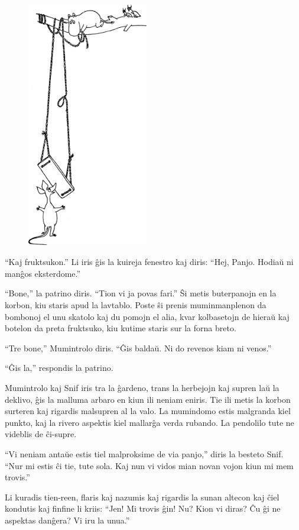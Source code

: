 \begin{figure}
\includegraphics[width=150pt,height=305pt]{1-2.png}\end{figure}

``Kaj fruktsukon.'' Li iris ĝis la kuireja fenestro kaj diris: ``Hej, Panjo. Hodiaŭ ni manĝos eksterdome.''

``Bone,'' la patrino diris. ``Tion vi ja povas fari.'' Ŝi metis buterpanojn en la korbon, kiu staris apud la lavtablo. Poste ŝi prenis muminmanplenon da bombonoj el unu skatolo kaj du pomojn el alia, kvar kolbasetojn de hieraŭ kaj botelon da preta fruktsuko, kiu kutime staris sur la forna breto.

``Tre bone,'' Mumintrolo diris. ``Ĝis baldaŭ. Ni do revenos kiam ni venos.''

``Ĝis la,'' respondis la patrino.

Mumintrolo kaj Snif iris tra la ĝardeno, trans la herbejojn kaj supren laŭ la deklivo, ĝis la malluma arbaro en kiun ili neniam eniris. Tie ili metis la korbon surteren kaj rigardis malsupren al la valo. La mumindomo estis malgranda kiel punkto, kaj la rivero aspektis kiel mallarĝa verda rubando. La pendolilo tute ne videblis de ĉi-supre.

``Vi neniam antaŭe estis tiel malproksime de via panjo,'' diris la besteto Snif. ``Nur mi estis ĉi tie, tute sola. Kaj nun vi vidos mian novan vojon kiun mi mem trovis.''

Li kuradis tien-reen, flaris kaj nazumis kaj rigardis la sunan altecon kaj ĉiel kondutis kaj finfine li kriis: ``Jen! Mi trovis ĝin! Nu? Kion vi diras? Ĉu ĝi ne aspektas danĝera? Vi iru la unua.''


